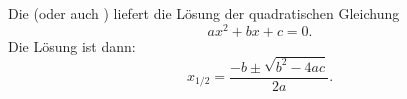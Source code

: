 Die  (oder auch ) liefert die Lösung der quadratischen Gleichung
$$ax^2+bx+c=0.$$
Die Lösung ist dann:
$$x_{1/2} = \frac{-b \pm \sqrt{b^2-4ac}}{2a}.$$
